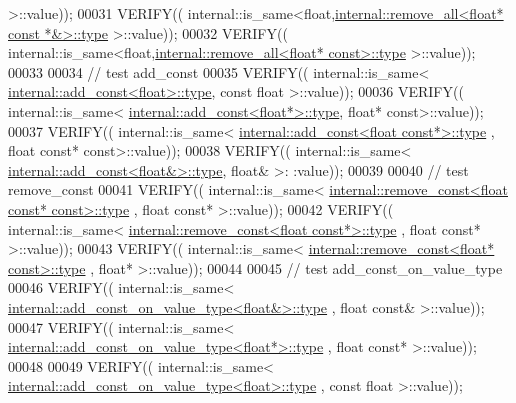 \begin{DoxyCode}
       >::value));
00031   VERIFY(( internal::is\_same<\textcolor{keywordtype}{float},\hyperlink{group___sparse_core___module}{internal::remove\_all<float* const *&>::type}
       >::value));
00032   VERIFY(( internal::is\_same<\textcolor{keywordtype}{float},\hyperlink{group___sparse_core___module}{internal::remove\_all<float* const>::type}
       >::value));
00033 
00034   \textcolor{comment}{// test add\_const}
00035   VERIFY(( internal::is\_same< \hyperlink{group___core___module_class_eigen_1_1_transpose}{internal::add\_const<float>::type}, \textcolor{keyword}{const} \textcolor{keywordtype}{float}
       >::value));
00036   VERIFY(( internal::is\_same< \hyperlink{group___core___module_class_eigen_1_1_transpose}{internal::add\_const<float*>::type}, \textcolor{keywordtype}{float}* \textcolor{keyword}{
      const}>::value));
00037   VERIFY(( internal::is\_same< \hyperlink{group___core___module_class_eigen_1_1_transpose}{internal::add\_const<float const*>::type}
      , \textcolor{keywordtype}{float} \textcolor{keyword}{const}* \textcolor{keyword}{const}>::value));
00038   VERIFY(( internal::is\_same< \hyperlink{group___core___module_class_eigen_1_1_transpose}{internal::add\_const<float&>::type}, \textcolor{keywordtype}{float}& >:
      :value));
00039 
00040   \textcolor{comment}{// test remove\_const}
00041   VERIFY(( internal::is\_same< \hyperlink{group___sparse_core___module}{internal::remove\_const<float const* const>::type}
      , \textcolor{keywordtype}{float} \textcolor{keyword}{const}* >::value));
00042   VERIFY(( internal::is\_same< \hyperlink{group___sparse_core___module}{internal::remove\_const<float const*>::type}
      , \textcolor{keywordtype}{float} \textcolor{keyword}{const}* >::value));
00043   VERIFY(( internal::is\_same< \hyperlink{group___sparse_core___module}{internal::remove\_const<float* const>::type}
      , \textcolor{keywordtype}{float}* >::value));
00044 
00045   \textcolor{comment}{// test add\_const\_on\_value\_type}
00046   VERIFY(( internal::is\_same< \hyperlink{group___sparse_core___module}{internal::add\_const\_on\_value\_type<float&>::type}
      , \textcolor{keywordtype}{float} \textcolor{keyword}{const}& >::value));
00047   VERIFY(( internal::is\_same< \hyperlink{group___sparse_core___module}{internal::add\_const\_on\_value\_type<float*>::type}
      , \textcolor{keywordtype}{float} \textcolor{keyword}{const}* >::value));
00048 
00049   VERIFY(( internal::is\_same< \hyperlink{group___sparse_core___module}{internal::add\_const\_on\_value\_type<float>::type}
      , \textcolor{keyword}{const} \textcolor{keywordtype}{float} >::value));

\end{DoxyCode}

